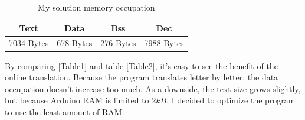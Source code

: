 \documentclass[a4paper]{article}
\begin{document}
\begin{table}[h]
  \centering
  \begin{tabular}{|| c || c || c || c ||}
    \hline
    \textbf{Text} & \textbf{Data} & \textbf{Bss} & \textbf{Dec} \\
    \hline
    7034 Bytes    & 678 Bytes     & 276 Bytes    & 7988 Bytes   \\
    \hline
  \end{tabular}
  \caption{My solution memory occupation}
  \label{Table2}
\end{table}

By comparing \autoref{Table1} and table \autoref{Table2}, it's easy to see the benefit of the online translation. Because the program translates letter by letter, the data occupation doesn't increase too much. As a downside, the text size grows slightly, but because Arduino RAM is limited to  \(2kB\), I decided to optimize the program to use the least amount of RAM.
\end{document}
